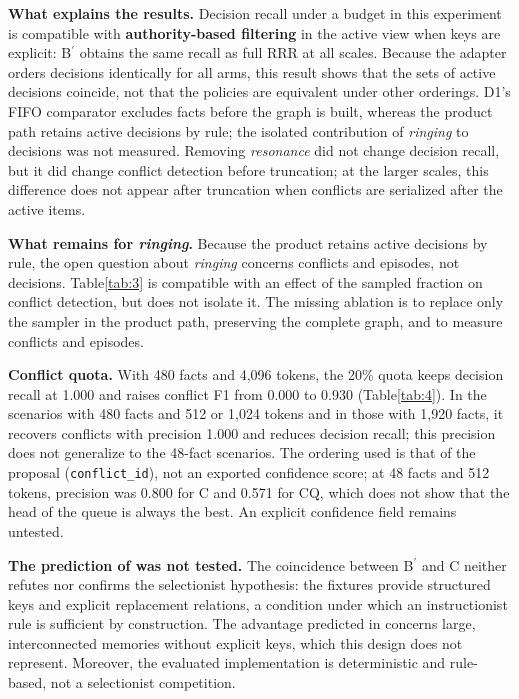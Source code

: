 \documentclass[11pt,a4paper]{article}
\begin{document}
\textbf{What explains the results.} Decision recall under a budget in this experiment is compatible with \textbf{authority-based filtering} in the active view when keys are explicit: B\ensuremath{^{\prime}} obtains the same recall as full RRR at all scales. Because the adapter orders decisions identically for all arms, this result shows that the sets of active decisions coincide, not that the policies are equivalent under other orderings. D1's FIFO comparator excludes facts before the graph is built, whereas the product path retains active decisions by rule; the isolated contribution of \emph{ringing} to decisions was not measured. Removing \emph{resonance} did not change decision recall, but it did change conflict detection before truncation; at the larger scales, this difference does not appear after truncation when conflicts are serialized after the active items.

\textbf{What remains for \emph{ringing}.} Because the product retains active decisions by rule, the open question about \emph{ringing} concerns conflicts and episodes, not decisions. Table\nobreakspace{}\ref{tab:3} is compatible with an effect of the sampled fraction on conflict detection, but does not isolate it. The missing ablation is to replace only the sampler in the product path, preserving the complete graph, and to measure conflicts and episodes.

\textbf{Conflict quota.} With 480 facts and 4,096 tokens, the 20\% quota keeps decision recall at 1.000 and raises conflict F1 from 0.000 to 0.930 (Table\nobreakspace{}\ref{tab:4}). In the scenarios with 480 facts and 512 or 1,024 tokens and in those with 1,920 facts, it recovers conflicts with precision 1.000 and reduces decision recall; this precision does not generalize to the 48-fact scenarios. The ordering used is that of the proposal (\texttt{conflict\_id}), not an exported confidence score; at 48 facts and 512 tokens, precision was 0.800 for C and 0.571 for CQ, which does not show that the head of the queue is always the best. An explicit confidence field remains untested.

\textbf{The prediction of \cite{ref2} was not tested.} The coincidence between B\ensuremath{^{\prime}} and C neither refutes nor confirms the selectionist hypothesis: the fixtures provide structured keys and explicit replacement relations, a condition under which an instructionist rule is sufficient by construction. The advantage predicted in \cite{ref2} concerns large, interconnected memories without explicit keys, which this design does not represent. Moreover, the evaluated implementation is deterministic and rule-based, not a selectionist competition.
\end{document}
